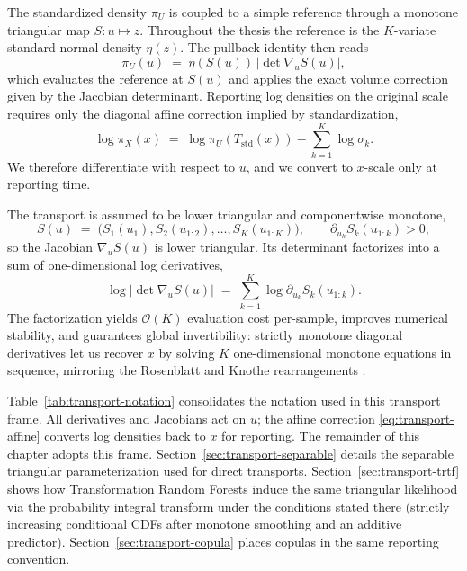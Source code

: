 \documentclass[11pt,a4paper,twoside]{book}\usepackage[]{graphicx}\usepackage[]{xcolor}
\begin{document}
The standardized density $\pi_U$ is coupled to a simple reference through a monotone triangular map $S:u\mapsto z$. Throughout the thesis the reference is the $K$-variate standard normal density $\eta(z)$. The pullback identity then reads
\begin{equation}
  \pi_U(u) \;=\; \eta\!\left(S(u)\right)\,\left|\det\nabla_u S(u)\right|,\label{eq:transport-pullback}
\end{equation}
which evaluates the reference at $S(u)$ and applies the exact volume correction given by the Jacobian determinant. Reporting log densities on the original scale requires only the diagonal affine correction implied by standardization,
\begin{equation}
  \log \pi_X(x) \;=\; \log \pi_U\!\left(T_{\mathrm{std}}(x)\right) - \sum_{k=1}^{K}\log\sigma_k.\label{eq:transport-affine}
\end{equation}
We therefore differentiate with respect to $u$, and we convert to $x$-scale only at reporting time.

The transport is assumed to be lower triangular and componentwise monotone,
\begin{equation}
  S(u) \;=\; \big(S_1(u_1), S_2(u_{1:2}), \ldots, S_K(u_{1:K})\big), \qquad \partial_{u_k}S_k(u_{1:k})>0,\label{eq:transport-triangular}
\end{equation}
so the Jacobian $\nabla_u S(u)$ is lower triangular. Its determinant factorizes into a sum of one-dimensional log derivatives,
\begin{equation}
  \log \big|\det \nabla_u S(u)\big| \;=\; \sum_{k=1}^{K}\log \partial_{u_k}S_k(u_{1:k}).\label{eq:transport-det}
\end{equation}
The factorization yields $\mathcal{O}(K)$ evaluation cost per-sample, improves numerical stability, and guarantees global invertibility: strictly monotone diagonal derivatives let us recover $x$ by solving $K$ one-dimensional monotone equations in sequence, mirroring the Rosenblatt and Knothe rearrangements \citep{rosenblatt1952remarks,knothe1957contributions}.

Table~\ref{tab:transport-notation} consolidates the notation used in this transport frame. All derivatives and Jacobians act on $u$; the affine correction \eqref{eq:transport-affine} converts log densities back to $x$ for reporting. The remainder of this chapter adopts this frame. Section~\ref{sec:transport-separable} details the separable triangular parameterization used for direct transports. Section~\ref{sec:transport-trtf} shows how Transformation Random Forests induce the same triangular likelihood via the probability integral transform under the conditions stated there (strictly increasing conditional CDFs after monotone smoothing and an additive predictor). Section~\ref{sec:transport-copula} places copulas in the same reporting convention.
\end{document}
